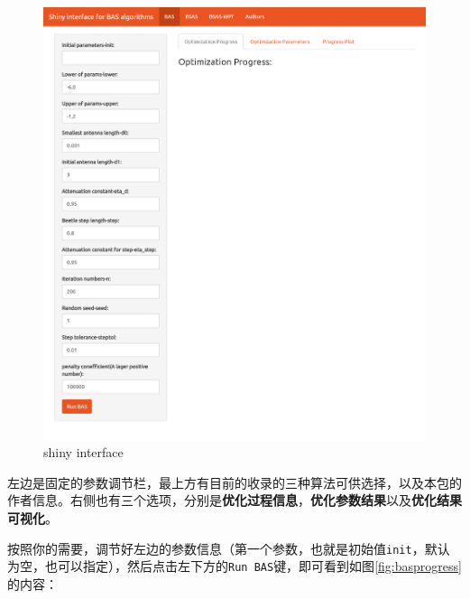 \documentclass[]{ctexbook}
\theoremstyle{definition}
\theoremstyle{definition}
\theoremstyle{definition}
\theoremstyle{remark}
\begin{document}
\begin{figure}

{\centering \includegraphics[width=0.95\linewidth]{img/app1} 

}

\caption{shiny interface}\label{fig:basapp}
\end{figure}

左边是固定的参数调节栏，最上方有目前的收录的三种算法可供选择，以及本包的作者信息。右侧也有三个选项，分别是\textbf{优化过程信息}，\textbf{优化参数结果}以及\textbf{优化结果可视化}。

按照你的需要，调节好左边的参数信息（第一个参数，也就是初始值\texttt{init}，默认为空，也可以指定），然后点击左下方的\texttt{Run\ BAS}键，即可看到如图\ref{fig:basprogress}的内容：
\end{document}
